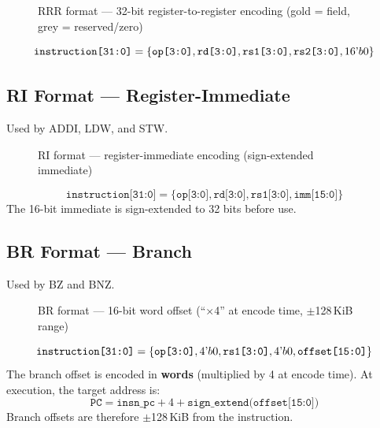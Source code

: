 \documentclass[11pt,a4paper]{article}
\begin{document}
\begin{figure}[H]
\centering
{}
\caption{RRR format --- 32-bit register-to-register encoding (gold = field, grey = reserved/zero)}
\end{figure}

\[
\texttt{instruction[31:0]} = \{ \texttt{op[3:0]}, \texttt{rd[3:0]}, \texttt{rs1[3:0]}, \texttt{rs2[3:0]}, 16\textrm{\textquoteright}b0 \}
\]

\subsection{RI Format --- Register-Immediate}
Used by ADDI, LDW, and STW.

\begin{figure}[H]
\centering
{}
\caption{RI format --- register-immediate encoding (sign-extended immediate)}
\end{figure}

\[
\texttt{instruction[31:0]} = \{ \texttt{op[3:0]}, \texttt{rd[3:0]}, \texttt{rs1[3:0]}, \texttt{imm[15:0]} \}
\]
The 16-bit immediate is sign-extended to 32 bits before use.

\subsection{BR Format --- Branch}
Used by BZ and BNZ.

\begin{figure}[H]
\centering
{}
\caption{BR format --- 16-bit word offset (``$\times$4'' at encode time, $\pm$128\,KiB range)}
\end{figure}

\[
\texttt{instruction[31:0]} = \{ \texttt{op[3:0]}, 4\textrm{\textquoteright}b0, \texttt{rs1[3:0]}, 4\textrm{\textquoteright}b0, \texttt{offset[15:0]} \}
\]
The branch offset is encoded in \textbf{words} (multiplied by 4 at encode time).
At execution, the target address is:
\[
\texttt{PC} = \texttt{insn\_pc} + 4 + \texttt{sign\_extend(offset[15:0])}
\]
Branch offsets are therefore $\pm$128\,KiB from the instruction.
\end{document}
